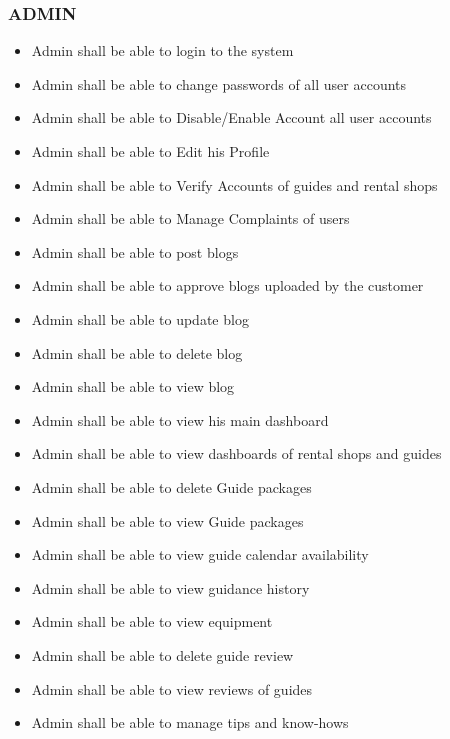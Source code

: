 
\subsubsection*{ADMIN}
\begin{itemize}
\itemsep0em 
    \item Admin shall be able to login to the system
    \item Admin shall be able to change passwords of all user accounts
    \item Admin shall be able to Disable/Enable Account all user accounts
    \item Admin shall be able to Edit his Profile
    \item Admin shall be able to Verify Accounts of guides and rental shops
    \item Admin shall be able to Manage Complaints of users
    \item Admin shall be able to post blogs
    \item Admin shall be able to approve blogs uploaded by the customer
    \item Admin shall be able to update blog
    \item Admin shall be able to delete blog
    \item Admin shall be able to view blog
    \item Admin shall be able to view his main dashboard
    \item Admin shall be able to view dashboards of rental shops and guides
    \item Admin shall be able to delete Guide packages
    \item Admin shall be able to view Guide packages
    \item Admin shall be able to view guide calendar availability
    \item Admin shall be able to view guidance history
    \item Admin shall be able to view equipment
    \item Admin shall be able to delete guide review
    \item Admin shall be able to view reviews of guides
    \item Admin shall be able to manage tips and know-hows
\end{itemize}
\newpage
